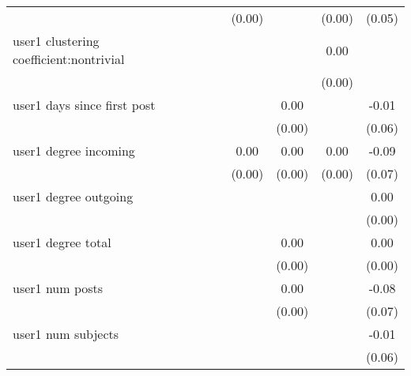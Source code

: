 \begin{table*}
\begin{center}
\begin{tabular}{lccccccc}
                                               &          &            &         & (0.00)  &          & (0.00)             & (0.05)   \\
user1 clustering coefficient:nontrivial        &          &            &         &         &          & 0.00               &          \\
                                               &          &            &         &         &          & (0.00)             &          \\
user1 days since first post                    &          &            &         &         & 0.00     &                    & -0.01    \\
                                               &          &            &         &         & (0.00)   &                    & (0.06)   \\
user1 degree incoming                          &          &            &         & 0.00    & 0.00     & 0.00               & -0.09    \\
                                               &          &            &         & (0.00)  & (0.00)   & (0.00)             & (0.07)   \\
user1 degree outgoing                          &          &            &         &         &          &                    & 0.00     \\
                                               &          &            &         &         &          &                    & (0.00)   \\
user1 degree total                             &          &            &         &         & 0.00     &                    & 0.00     \\
                                               &          &            &         &         & (0.00)   &                    & (0.00)   \\
user1 num posts                                &          &            &         &         & 0.00     &                    & -0.08    \\
                                               &          &            &         &         & (0.00)   &                    & (0.07)   \\
user1 num subjects                             &          &            &         &         &          &                    & -0.01    \\
                                               &          &            &         &         &          &                    & (0.06)   \\

\end{tabular}
\end{center}
\end{table*}
